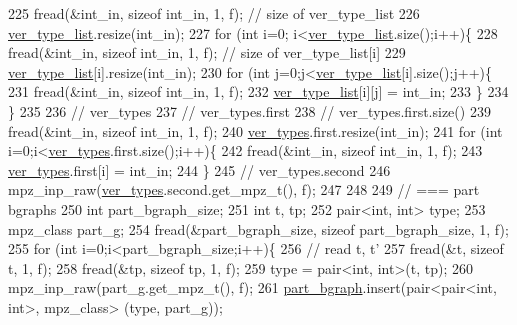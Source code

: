 \begin{DoxyCode}
225   fread(&int\_in, \textcolor{keyword}{sizeof} int\_in, 1, f); \textcolor{comment}{// size of ver\_type\_list}
226   \hyperlink{classmarked__graph__compressed_af2e3e55223d436628a02758dfae88493}{ver\_type\_list}.resize(int\_in);
227   \textcolor{keywordflow}{for} (\textcolor{keywordtype}{int} i=0; i<\hyperlink{classmarked__graph__compressed_af2e3e55223d436628a02758dfae88493}{ver\_type\_list}.size();i++)\{
228     fread(&int\_in, \textcolor{keyword}{sizeof} int\_in, 1, f); \textcolor{comment}{// size of ver\_type\_list[i]}
229     \hyperlink{classmarked__graph__compressed_af2e3e55223d436628a02758dfae88493}{ver\_type\_list}[i].resize(int\_in);
230     \textcolor{keywordflow}{for} (\textcolor{keywordtype}{int} j=0;j<\hyperlink{classmarked__graph__compressed_af2e3e55223d436628a02758dfae88493}{ver\_type\_list}[i].size();j++)\{
231       fread(&int\_in, \textcolor{keyword}{sizeof} int\_in, 1, f);
232       \hyperlink{classmarked__graph__compressed_af2e3e55223d436628a02758dfae88493}{ver\_type\_list}[i][j] = int\_in;
233     \}
234   \}
235 
236   \textcolor{comment}{// ver\_types}
237   \textcolor{comment}{// ver\_types.first}
238   \textcolor{comment}{// ver\_types.first.size()}
239   fread(&int\_in, \textcolor{keyword}{sizeof} int\_in, 1, f);
240   \hyperlink{classmarked__graph__compressed_af446cc5e23c241a92b76642fd5ebc403}{ver\_types}.first.resize(int\_in);
241   \textcolor{keywordflow}{for} (\textcolor{keywordtype}{int} i=0;i<\hyperlink{classmarked__graph__compressed_af446cc5e23c241a92b76642fd5ebc403}{ver\_types}.first.size();i++)\{
242     fread(&int\_in, \textcolor{keyword}{sizeof} int\_in, 1, f);
243     \hyperlink{classmarked__graph__compressed_af446cc5e23c241a92b76642fd5ebc403}{ver\_types}.first[i] = int\_in;
244   \}
245   \textcolor{comment}{// ver\_types.second}
246   mpz\_inp\_raw(\hyperlink{classmarked__graph__compressed_af446cc5e23c241a92b76642fd5ebc403}{ver\_types}.second.get\_mpz\_t(), f);
247 
248 
249   \textcolor{comment}{// === part bgraphs}
250   \textcolor{keywordtype}{int} part\_bgraph\_size;
251   \textcolor{keywordtype}{int} t, tp;
252   pair<int, int> type; 
253   mpz\_class part\_g; 
254   fread(&part\_bgraph\_size, \textcolor{keyword}{sizeof} part\_bgraph\_size, 1, f);
255   \textcolor{keywordflow}{for} (\textcolor{keywordtype}{int} i=0;i<part\_bgraph\_size;i++)\{
256     \textcolor{comment}{// read t, t'}
257     fread(&t, \textcolor{keyword}{sizeof} t, 1, f);
258     fread(&tp, \textcolor{keyword}{sizeof} tp, 1, f);
259     type = pair<int, int>(t, tp);
260     mpz\_inp\_raw(part\_g.get\_mpz\_t(), f);
261     \hyperlink{classmarked__graph__compressed_a7b3267063fba30b45eb21b3ba4e07536}{part\_bgraph}.insert(pair<pair<int, int>, mpz\_class> (type, part\_g));

\end{DoxyCode}
